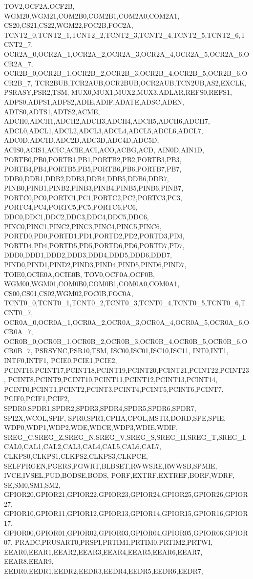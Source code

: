 {{		TOV2,OCF2A,OCF2B,
		WGM20,WGM21,COM2B0,COM2B1,COM2A0,COM2A1,
		CS20,CS21,CS22,WGM22,FOC2B,FOC2A,
		TCNT2_0,TCNT2_1,TCNT2_2,TCNT2_3,TCNT2_4,TCNT2_5,TCNT2_6,TCNT2_7,
		OCR2A_0,OCR2A_1,OCR2A_2,OCR2A_3,OCR2A_4,OCR2A_5,OCR2A_6,OCR2A_7,
		OCR2B_0,OCR2B_1,OCR2B_2,OCR2B_3,OCR2B_4,OCR2B_5,OCR2B_6,OCR2B_7,
		TCR2BUB,TCR2AUB,OCR2BUB,OCR2AUB,TCN2UB,AS2,EXCLK,
		PSRASY,PSR2,TSM,
		MUX0,MUX1,MUX2,MUX3,ADLAR,REFS0,REFS1,
		ADPS0,ADPS1,ADPS2,ADIE,ADIF,ADATE,ADSC,ADEN,
		ADTS0,ADTS1,ADTS2,ACME,
		ADCH0,ADCH1,ADCH2,ADCH3,ADCH4,ADCH5,ADCH6,ADCH7,
		ADCL0,ADCL1,ADCL2,ADCL3,ADCL4,ADCL5,ADCL6,ADCL7,
		ADC0D,ADC1D,ADC2D,ADC3D,ADC4D,ADC5D,
		ACIS0,ACIS1,ACIC,ACIE,ACI,ACO,ACBG,ACD,
		AIN0D,AIN1D,
		PORTB0,PB0,PORTB1,PB1,PORTB2,PB2,PORTB3,PB3,
		PORTB4,PB4,PORTB5,PB5,PORTB6,PB6,PORTB7,PB7,
		DDB0,DDB1,DDB2,DDB3,DDB4,DDB5,DDB6,DDB7,
		PINB0,PINB1,PINB2,PINB3,PINB4,PINB5,PINB6,PINB7,
		PORTC0,PC0,PORTC1,PC1,PORTC2,PC2,PORTC3,PC3,
		PORTC4,PC4,PORTC5,PC5,PORTC6,PC6,
		DDC0,DDC1,DDC2,DDC3,DDC4,DDC5,DDC6,
		PINC0,PINC1,PINC2,PINC3,PINC4,PINC5,PINC6,
		PORTD0,PD0,PORTD1,PD1,PORTD2,PD2,PORTD3,PD3,
		PORTD4,PD4,PORTD5,PD5,PORTD6,PD6,PORTD7,PD7,
		DDD0,DDD1,DDD2,DDD3,DDD4,DDD5,DDD6,DDD7,
		PIND0,PIND1,PIND2,PIND3,PIND4,PIND5,PIND6,PIND7,
		TOIE0,OCIE0A,OCIE0B,
		TOV0,OCF0A,OCF0B,
		WGM00,WGM01,COM0B0,COM0B1,COM0A0,COM0A1,
		CS00,CS01,CS02,WGM02,FOC0B,FOC0A,
		TCNT0_0,TCNT0_1,TCNT0_2,TCNT0_3,TCNT0_4,TCNT0_5,TCNT0_6,TCNT0_7,
		OCR0A_0,OCR0A_1,OCR0A_2,OCR0A_3,OCR0A_4,OCR0A_5,OCR0A_6,OCR0A_7,
		OCR0B_0,OCR0B_1,OCR0B_2,OCR0B_3,OCR0B_4,OCR0B_5,OCR0B_6,OCR0B_7,
		PSRSYNC,PSR10,TSM,
		ISC00,ISC01,ISC10,ISC11,
		INT0,INT1,
		INTF0,INTF1,
		PCIE0,PCIE1,PCIE2,
		PCINT16,PCINT17,PCINT18,PCINT19,PCINT20,PCINT21,PCINT22,PCINT23,
		PCINT8,PCINT9,PCINT10,PCINT11,PCINT12,PCINT13,PCINT14,
		PCINT0,PCINT1,PCINT2,PCINT3,PCINT4,PCINT5,PCINT6,PCINT7,
		PCIF0,PCIF1,PCIF2,
		SPDR0,SPDR1,SPDR2,SPDR3,SPDR4,SPDR5,SPDR6,SPDR7,
		SPI2X,WCOL,SPIF,
		SPR0,SPR1,CPHA,CPOL,MSTR,DORD,SPE,SPIE,
		WDP0,WDP1,WDP2,WDE,WDCE,WDP3,WDIE,WDIF,
		SREG_C,SREG_Z,SREG_N,SREG_V,SREG_S,SREG_H,SREG_T,SREG_I,
		CAL0,CAL1,CAL2,CAL3,CAL4,CAL5,CAL6,CAL7,
		CLKPS0,CLKPS1,CLKPS2,CLKPS3,CLKPCE,
		SELFPRGEN,PGERS,PGWRT,BLBSET,RWWSRE,RWWSB,SPMIE,
		IVCE,IVSEL,PUD,BODSE,BODS,
		PORF,EXTRF,EXTREF,BORF,WDRF,
		SE,SM0,SM1,SM2,
		GPIOR20,GPIOR21,GPIOR22,GPIOR23,GPIOR24,GPIOR25,GPIOR26,GPIOR27,
		GPIOR10,GPIOR11,GPIOR12,GPIOR13,GPIOR14,GPIOR15,GPIOR16,GPIOR17,
		GPIOR00,GPIOR01,GPIOR02,GPIOR03,GPIOR04,GPIOR05,GPIOR06,GPIOR07,
		PRADC,PRUSART0,PRSPI,PRTIM1,PRTIM0,PRTIM2,PRTWI,
		EEAR0,EEAR1,EEAR2,EEAR3,EEAR4,EEAR5,EEAR6,EEAR7,
		EEAR8,EEAR9,
		EEDR0,EEDR1,EEDR2,EEDR3,EEDR4,EEDR5,EEDR6,EEDR7,
}}
